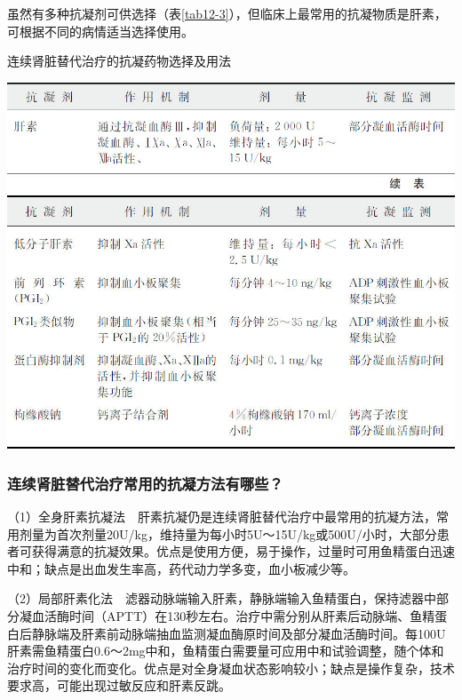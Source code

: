 虽然有多种抗凝剂可供选择（表\ref{tab12-3}），但临床上最常用的抗凝物质是肝素，可根据不同的病情适当选择使用。

\begin{table}[htbp]
\centering
\caption{连续肾脏替代治疗的抗凝药物选择及用法}
\label{tab12-3}
\includegraphics[width=\textwidth,height=\textheight,keepaspectratio]{./images/Image00096.jpg}
\includegraphics[width=\textwidth,height=\textheight,keepaspectratio]{./images/Image00097.jpg}
\end{table}

\subsubsection{连续肾脏替代治疗常用的抗凝方法有哪些？}

（1）全身肝素抗凝法　肝素抗凝仍是连续肾脏替代治疗中最常用的抗凝方法，常用剂量为首次剂量20U/kg，维持量为每小时5U～15U/kg或500U/小时，大部分患者可获得满意的抗凝效果。优点是使用方便，易于操作，过量时可用鱼精蛋白迅速中和；缺点是出血发生率高，药代动力学多变，血小板减少等。

（2）局部肝素化法　滤器动脉端输入肝素，静脉端输入鱼精蛋白，保持滤器中部分凝血活酶时间（APTT）在130秒左右。治疗中需分别从肝素后动脉端、鱼精蛋白后静脉端及肝素前动脉端抽血监测凝血酶原时间及部分凝血活酶时间。每100U肝素需鱼精蛋白0.6～2mg中和，鱼精蛋白需要量可应用中和试验调整，随个体和治疗时间的变化而变化。优点是对全身凝血状态影响较小；缺点是操作复杂，技术要求高，可能出现过敏反应和肝素反跳。

